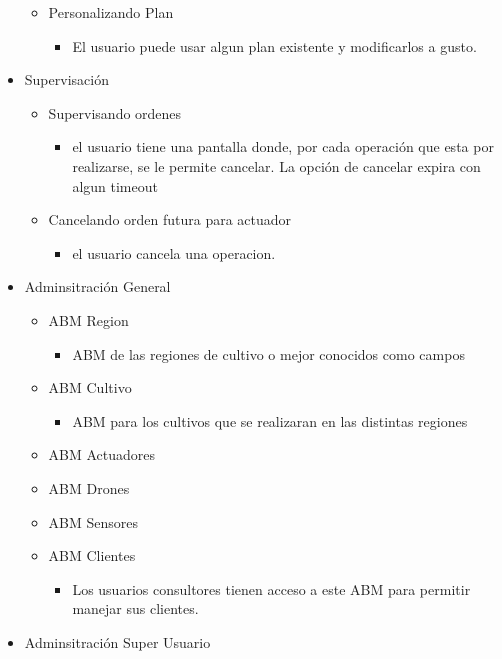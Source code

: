 \begin{itemize}
\begin{itemize}
    \item Personalizando Plan
    \begin{itemize}
	\item El usuario puede usar algun plan existente y modificarlos a gusto.
    \end{itemize}
 \end{itemize}
 \item Supervisaci\'on
 \begin{itemize}
  \item Supervisando ordenes
  \begin{itemize}
    \item el usuario tiene una pantalla donde, por cada operaci\'on que esta por realizarse, se le permite cancelar. La opci\'on de cancelar expira con algun timeout 
  \end{itemize}
  \item Cancelando orden futura para actuador
  \begin{itemize}
    \item el usuario cancela una operacion.
  \end{itemize}
 \end{itemize} 
 \item Adminsitraci\'on General
 \begin{itemize}
    \item ABM Region 
    \begin{itemize}
	\item ABM de las regiones de cultivo o mejor conocidos como campos
    \end{itemize}
    \item ABM Cultivo
    \begin{itemize}
	\item ABM para los cultivos que se realizaran en las distintas regiones
    \end{itemize}
    \item ABM Actuadores
    \item ABM Drones
    \item ABM Sensores
    \item ABM Clientes
    \begin{itemize}
	\item Los usuarios consultores tienen acceso a este ABM para permitir manejar sus clientes.
    \end{itemize}
 \end{itemize}
 \item Adminsitraci\'on Super Usuario

\end{itemize}

